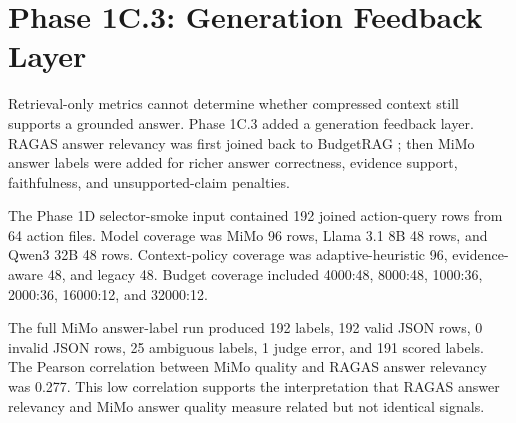 \section{Phase 1C.3: Generation Feedback Layer}

Retrieval-only metrics cannot determine whether compressed context still supports a grounded answer. Phase 1C.3 added a generation feedback layer. RAGAS answer relevancy was first joined back to BudgetRAG ; then MiMo answer labels were added for richer answer correctness, evidence support, faithfulness, and unsupported-claim penalties.

The Phase 1D selector-smoke input contained 192 joined action-query rows from 64 action files. Model coverage was MiMo 96 rows, Llama 3.1 8B 48 rows, and Qwen3 32B 48 rows. Context-policy coverage was adaptive-heuristic 96, evidence-aware 48, and legacy 48. Budget coverage included 4000:48, 8000:48, 1000:36, 2000:36, 16000:12, and 32000:12.

The full MiMo answer-label run produced 192 labels, 192 valid JSON rows, 0 invalid JSON rows, 25 ambiguous labels, 1 judge error, and 191 scored labels. The Pearson correlation between MiMo quality and RAGAS answer relevancy was 0.277. This low correlation supports the interpretation that RAGAS answer relevancy and MiMo answer quality measure related but not identical signals.
